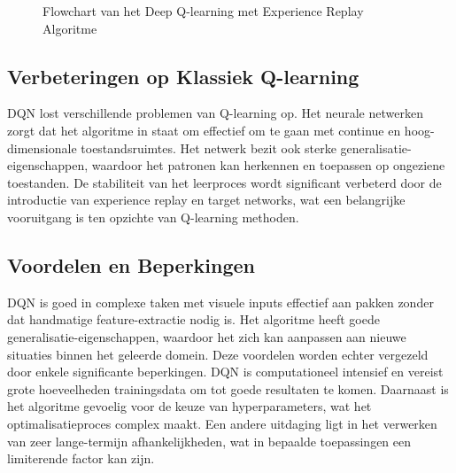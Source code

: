 \documentclass[a4paper,12pt]{report}
\begin{document}
\begin{figure}
    \caption{Flowchart van het Deep Q-learning met Experience Replay Algoritme}
    \label{fig:dqn_flowchart}
\end{figure}

\subsection{Verbeteringen op Klassiek Q-learning}
DQN lost verschillende problemen van Q-learning op. Het neurale netwerken zorgt
dat het algoritme in staat om effectief om te gaan met continue en
hoog-dimensionale toestandsruimtes. Het netwerk bezit ook sterke
generalisatie-eigenschappen, waardoor het patronen kan herkennen en toepassen
op ongeziene toestanden. De stabiliteit van het leerproces wordt significant
verbeterd door de introductie van experience replay en target networks, wat een
belangrijke vooruitgang is ten opzichte van Q-learning methoden.

\subsection{Voordelen en Beperkingen}
DQN is goed in complexe taken met visuele inputs effectief aan pakken zonder
dat handmatige feature-extractie nodig is. Het algoritme heeft goede
generalisatie-eigenschappen, waardoor het zich kan aanpassen aan nieuwe
situaties binnen het geleerde domein. Deze voordelen worden echter vergezeld
door enkele significante beperkingen. DQN is computationeel intensief en
vereist grote hoeveelheden trainingsdata om tot goede resultaten te komen.
Daarnaast is het algoritme gevoelig voor de keuze van hyperparameters, wat het
optimalisatieproces complex maakt. Een andere uitdaging ligt in het verwerken
van zeer lange-termijn afhankelijkheden, wat in bepaalde toepassingen een
limiterende factor kan zijn.
\end{document}
